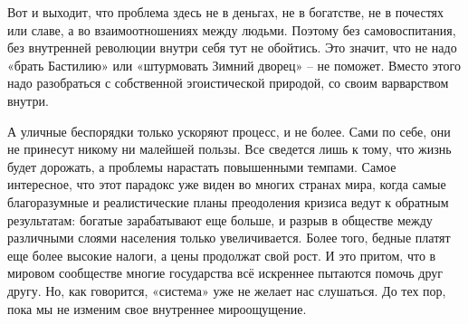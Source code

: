 Вот и выходит, что проблема здесь не в деньгах, не в богатстве, не в почестях
или славе, а во взаимоотношениях между людьми. Поэтому без самовоспитания, без
внутренней революции внутри себя тут не обойтись. Это значит, что не надо
«брать Бастилию» или «штурмовать Зимний дворец» – не поможет. Вместо этого надо
разобраться с собственной эгоистической природой, со своим варварством внутри.

А уличные беспорядки только ускоряют процесс, и не более. Сами по себе, они не
принесут никому ни малейшей пользы. Все сведется лишь к тому, что жизнь будет
дорожать, а проблемы нарастать повышенными темпами. Самое интересное, что этот
парадокс уже виден во многих странах мира, когда самые благоразумные и
реалистические планы преодоления кризиса ведут к обратным результатам: богатые
зарабатывают еще больше, и разрыв в обществе между различными слоями населения
только увеличивается. Более того, бедные платят еще более высокие налоги, а
цены продолжат свой рост. И это притом, что в мировом сообществе многие
государства всё искреннее пытаются помочь друг другу. Но, как говорится,
«система» уже не желает нас слушаться. До тех пор, пока мы не изменим свое
внутреннее мироощущение.
